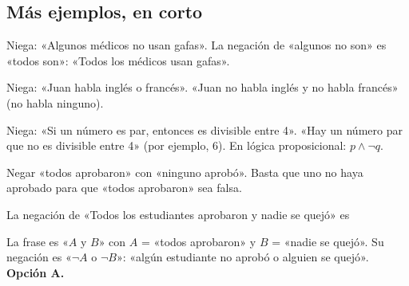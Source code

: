 \subsection{Más ejemplos, en corto}
\begin{ejemplo}
Niega: «Algunos médicos no usan gafas».
\solucion La negación de «algunos no son» es «todos son»: «Todos los médicos usan gafas».
\end{ejemplo}

\begin{ejemplo}
Niega: «Juan habla inglés o francés».
\solucion «Juan no habla inglés y no habla francés» (no habla ninguno).
\end{ejemplo}

\begin{ejemplo}[Condicional]
Niega: «Si un número es par, entonces es divisible entre 4».
\solucion «Hay un número par que no es divisible entre 4» (por ejemplo, 6). En lógica proposicional: $p \wedge \neg q$.
\end{ejemplo}

\begin{trampa}
Negar «todos aprobaron» con «ninguno aprobó». Basta que uno no haya aprobado para que «todos aprobaron» sea falsa.
\end{trampa}

\begin{reto}
La negación de «Todos los estudiantes aprobaron y nadie se quejó» es
\end{reto}

\begin{retoresuelto}
La frase es «$A$ y $B$» con $A$ = «todos aprobaron» y $B$ = «nadie se quejó». Su negación es «$\neg A$ o $\neg B$»:
«algún estudiante no aprobó o alguien se quejó». \textbf{Opción A.}
\end{retoresuelto}

